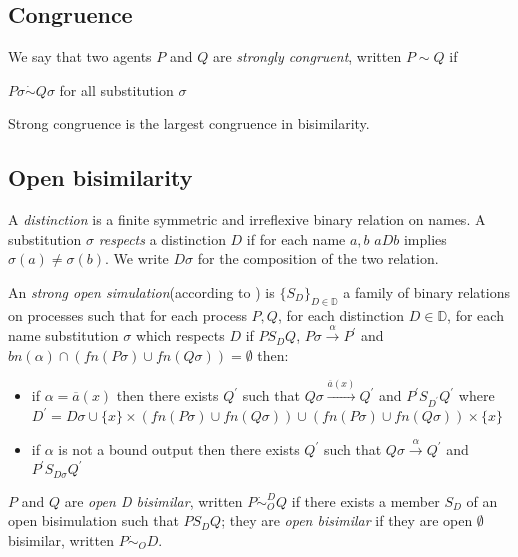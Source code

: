 \subsection{Congruence}

\begin{definition}
  We say that two agents $P$ and $Q$ are \emph{strongly congruent}, written $P\sim Q$ if
  \begin{center}
    $P\sigma \dot{\sim} Q\sigma$ for all substitution $\sigma$    
  \end{center}
\end{definition}

\begin{proposition}
  Strong congruence is the largest congruence in bisimilarity.
\end{proposition}


\subsection{Open bisimilarity}

\begin{definition}
  A \emph{distinction} is a finite symmetric and irreflexive binary relation on names. A substitution $\sigma$ \emph{respects} a distinction $D$ if for each name $a,b$ $aDb$ implies $\sigma(a)\neq \sigma(b)$. We write $D\sigma$ for the composition of the two relation.
\end{definition}


\begin{definition}
  An \emph{strong open simulation}(according to \cite{parrow}) is $\{S_{D}\}_{D\in \mathbb{D}}$ a family of binary relations on processes such that for each process $P, Q$, for each distinction $D\in \mathbb{D}$, for each name substitution $\sigma$ which respects $D$ if $P S_{D} Q$, $P\sigma \xrightarrow{\alpha} P^{'}$ and $bn(\alpha)\cap (fn(P\sigma)\cup fn(Q\sigma))=\emptyset$ then:
  \begin{itemize}
    \item 
      if $\alpha=\overline{a}(x)$ then there exists $Q^{'}$ such that $Q\sigma \xrightarrow{\overline{a}(x)} Q^{'}$ and $P^{'} S_{D^{'}} Q^{'}$ where $D^{'}=D\sigma \cup \{x\}\times (fn(P\sigma)\cup fn(Q\sigma)) \cup  (fn(P\sigma)\cup fn(Q\sigma))\times\{x\}$
    \item
      if $\alpha$ is not a bound output then there exists $Q^{'}$ such that $Q\sigma \xrightarrow{\alpha} Q^{'}$ and $P^{'} S_{D\sigma} Q^{'}$
  \end{itemize}
  $P$ and $Q$ are \emph{open D bisimilar}, written $P \dot{\sim}_{O}^{D} Q$ if there exists a member $S_{D}$ of an open bisimulation such that $P S_{D} Q$; they are \emph{open bisimilar} if they are open $\emptyset$ bisimilar, written $P \dot{\sim}_{O} D$.


\end{definition}


















